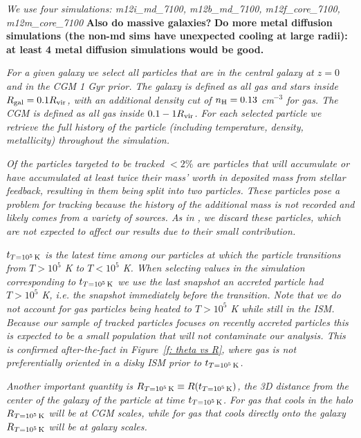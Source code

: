 \documentclass[fleqn,usenatbib]{mnras}
\newcommand{\Rcon}{R_{T=10^5\,{\rm K}}}
\newcommand{\tcon}{t_{T=10^5\,{\rm K}}}
\begin{document}
\textit{
We use four simulations:
m12i\_md\_7100, m12b\_md\_7100, m12f\_core\_7100, m12m\_core\_7100
}
\textbf{Also do massive galaxies?}
\textbf{Do more metal diffusion simulations (the non-md sims have unexpected cooling at large radii): at least 4 metal diffusion simulations would be good.}

\textit{
For a given galaxy we select all particles that are in the central galaxy at $z=0$ and in the CGM 1 Gyr prior.
The galaxy is defined as all gas and stars inside $R_{\rm gal} = 0.1 R_{\rm vir}$, with an additional density cut of $n_{\rm H} = 0.13$ cm$^{-3}$ for gas.
The CGM is defined as all gas inside $0.1 -1 R_{\rm vir}$.
For each selected particle we retrieve the full history of the particle (including temperature, density, metallicity) throughout the simulation.
}

\textit{
Of the particles targeted to be tracked $<2\%$ are particles that will accumulate or have accumulated at least twice their mass' worth in deposited mass from stellar feedback, resulting in them being split into two particles.
These particles pose a problem for tracking because the history of the additional mass is not recorded and likely comes from a variety of sources.
As in \cite{Hafen2019}, we discard these particles, which are not expected to affect our results due to their small contribution.
}

\textit{
$\tcon$ is the latest time among our particles at which the particle transitions from $T > 10^5$ K to $T< 10^5$ K.
When selecting values in the simulation corresponding to $\tcon$ we use the last snapshot an accreted particle had $T > 10^5$ K, i.e. the snapshot immediately before the transition.
Note that we do not account for gas particles being heated to $T > 10^5$ K while still in the ISM.
Because our sample of tracked particles focuses on recently accreted particles this is expected to be a small population that will not contaminate our analysis.
This is confirmed after-the-fact in Figure~\ref{f: theta vs R}, where gas is not preferentially oriented in a disky ISM prior to $\tcon$.
}

\textit{
Another important quantity is $\Rcon\equiv R(\tcon)$, the 3D distance from the center of the galaxy of the particle at time $\tcon$.
For gas that cools in the halo $\Rcon$  will be at CGM scales, while for gas that cools directly onto the galaxy $\Rcon$ will be at galaxy scales.
}
\end{document}

